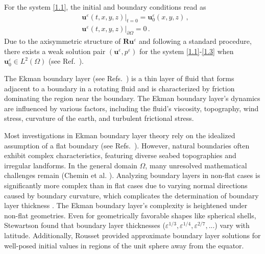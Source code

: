 \documentclass[pdflatex,sn-mathphys-num]{sn-jnl}%
\theoremstyle{thmstyleone}%
\theoremstyle{thmstyletwo}%
\theoremstyle{thmstylethree}%
\theoremstyle{thmstyletwo}
\begin{document}
For the system \eqref{1.1}, the initial and boundary conditions read as
\begin{align}
	&\boldsymbol{u}^\varepsilon(t,x,y,z)|_{t=0}=\boldsymbol{u}^\varepsilon_0(x,y,z)\, ,\label{1.2}
	\\
	&\boldsymbol{u}^\varepsilon(t,x,y,z)|_{\partial \Omega}=0\, .\label{1.3}
\end{align}
Due to the axisymmetric structure of $\boldsymbol{R}\boldsymbol{u}^\varepsilon$ and following a standard procedure, there exists a weak solution pair $(\boldsymbol{u}^\varepsilon,{p}^\varepsilon)$ for the system \eqref{1.1}-\eqref{1.3} when $\boldsymbol{u}^\varepsilon_0 \in L^2(\Omega)$ (see Ref.~\cite{Chemin2006}).

The Ekman boundary layer (see Refs.~\cite{Greenspan1968,Pedlosky}) is a thin layer of fluid that forms adjacent to a boundary in a rotating fluid and is characterized by friction dominating the region near the boundary. 
The Ekman boundary layer's dynamics are influenced by various factors, including the fluid's viscosity, topography, wind stress, curvature of the earth, and turbulent frictional stress. 

Most investigations in Ekman boundary layer theory rely on the idealized assumption of a flat boundary (see Refs.~\cite{Chemin2006,Grenier1997,Li2019,Masmoudi2000,giga2007,giga2013}). However, natural boundaries often exhibit complex characteristics, featuring diverse seabed topographies and irregular landforms. In the general domain $\Omega$, many unresolved mathematical challenges remain (Chemin et al. \cite{Chemin2006}). Analyzing boundary layers in non-flat cases is significantly more complex than in flat cases due to varying normal directions caused by boundary curvature, which complicates the determination of boundary layer thickness \cite{Gerard2005}. The Ekman boundary layer's complexity is heightened under non-flat geometries. Even for geometrically favorable shapes like spherical shells, Stewartson \cite{Stewartson} found that boundary layer thicknesses ($\varepsilon^{1/3}, \varepsilon^{1/4}, \varepsilon^{2/7},...$) vary with latitude. Additionally, Rousset \cite{Rousset2007} provided approximate boundary layer solutions for well-posed initial values in regions of the unit sphere away from the equator.
\end{document}
